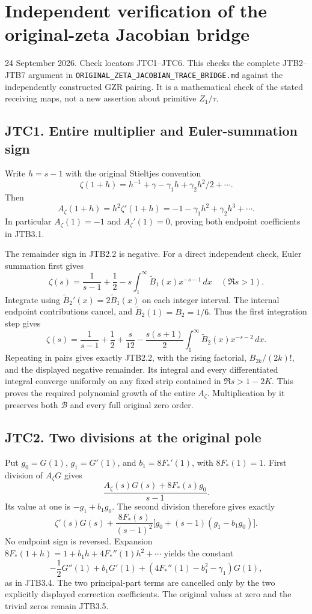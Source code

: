 \section{Independent verification of the original-zeta Jacobian
bridge}\label{independent-verification-of-the-original-zeta-jacobian-bridge}

24 September 2026. Check locators JTC1--JTC6. This checks the complete
JTB2--JTB7 argument in \nolinkurl{ORIGINAL_ZETA_JACOBIAN_TRACE_BRIDGE.md}
against the independently constructed GZR pairing. It is a mathematical
check of the stated receiving maps, not a new assertion about primitive
\(Z_1/\tau\).

\subsection{JTC1. Entire multiplier and Euler-summation
sign}\label{jtc1.-entire-multiplier-and-euler-summation-sign}

Write \(h=s-1\) with the original Stieltjes convention \[
\zeta(1+h)=h^{-1}+\gamma-\gamma_1h+\gamma_2h^2/2+\cdots.
\] Then \[
A_\zeta(1+h)=h^2\zeta'(1+h)=-1-\gamma_1h^2+\gamma_2h^3+\cdots.
\] In particular \(A_\zeta(1)=-1\) and \(A_\zeta'(1)=0\), proving both
endpoint coefficients in JTB3.1.

The remainder sign in JTB2.2 is negative. For a direct independent
check, Euler summation first gives \[
\zeta(s)=\frac1{s-1}+\frac12
-s\int_1^\infty\widetilde B_1(x)x^{-s-1}\,dx
\quad(\Re s>1).
\] Integrate using \(\widetilde B_2'(x)=2\widetilde B_1(x)\) on each
integer interval. The internal endpoint contributions cancel, and
\(\widetilde B_2(1)=B_2=1/6\). Thus the first integration step gives \[
\zeta(s)=\frac1{s-1}+\frac12+\frac{s}{12}
-\frac{s(s+1)}2\int_1^\infty\widetilde B_2(x)x^{-s-2}\,dx.
\] Repeating in pairs gives exactly JTB2.2, with the rising factorial,
\(B_{2k}/(2k)!\), and the displayed negative remainder. Its integral and
every differentiated integral converge uniformly on any fixed strip
contained in \(\Re s>1-2K\). This proves the required polynomial growth
of the entire \(A_\zeta\). Multiplication by it preserves both
\(\mathcal B\) and every full original zero order.

\subsection{JTC2. Two divisions at the original
pole}\label{jtc2.-two-divisions-at-the-original-pole}

Put \(g_0=G(1)\), \(g_1=G'(1)\), and \(b_1=8F_*'(1)\), with
\(8F_*(1)=1\). First division of \(A_\zeta G\) gives \[
\frac{A_\zeta(s)G(s)+8F_*(s)g_0}{s-1}.
\] Its value at one is \(-g_1+b_1g_0\). The second division therefore
gives exactly \[
\zeta'(s)G(s)+\frac{8F_*(s)}{(s-1)^2}
\bigl[g_0+(s-1)(g_1-b_1g_0)\bigr].
\] No endpoint sign is reversed. Expansion
\(8F_*(1+h)=1+b_1h+4F_*''(1)h^2+\cdots\) yields the constant \[
-\frac12G''(1)+b_1G'(1)
+(4F_*''(1)-b_1^2-\gamma_1)G(1),
\] as in JTB3.4. The two principal-part terms are cancelled only by the
two explicitly displayed correction coefficients. The original values at
zero and the trivial zeros remain JTB3.5.

